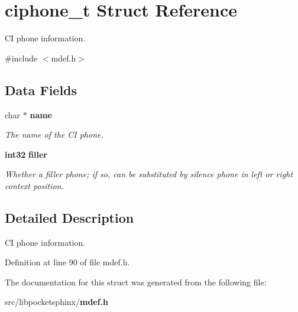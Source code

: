 \section{ciphone\-\_\-t \-Struct \-Reference}
\label{structciphone__t}


\-C\-I phone information.  




{\ttfamily \#include $<$mdef.\-h$>$}

\subsection*{\-Data \-Fields}
\begin{DoxyCompactItemize}
\item 
char $\ast$ {\bf name}\label{structciphone__t_a2327c5f09fa245c25926c718fdab642d}

\begin{DoxyCompactList}\small\item\em \-The name of the \-C\-I phone. \end{DoxyCompactList}\item 
{\bf int32} {\bf filler}\label{structciphone__t_a96e20b175c00c4edcd75d922dba067cd}

\begin{DoxyCompactList}\small\item\em \-Whether a filler phone; if so, can be substituted by silence phone in left or right context position. \end{DoxyCompactList}\end{DoxyCompactItemize}


\subsection{\-Detailed \-Description}
\-C\-I phone information. 

\-Definition at line 90 of file mdef.\-h.



\-The documentation for this struct was generated from the following file\-:\begin{DoxyCompactItemize}
\item 
src/libpocketsphinx/{\bf mdef.\-h}\end{DoxyCompactItemize}
